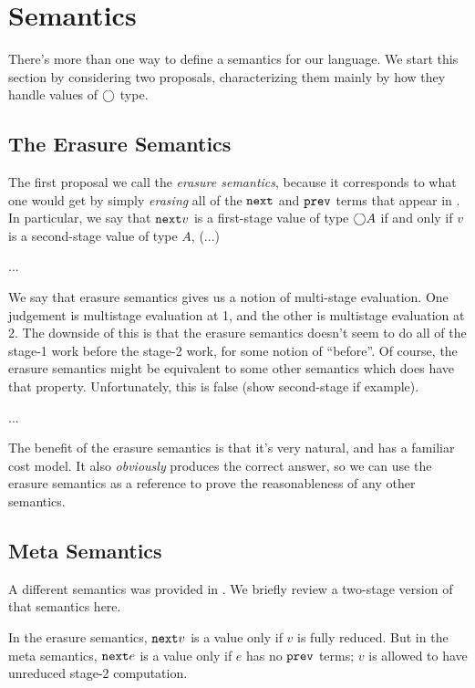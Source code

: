 
\section{Semantics}

There's more than one way to define a semantics for our language.  We start this section by considering two proposals, characterizing them mainly by how they handle values of $\bigcirc$ type.

\subsection{The Erasure Semantics}

The first proposal we call the {\em erasure semantics}, because it corresponds to what one would get by simply {\em erasing} all of the ${\tt next}$ and ${\tt prev}$ terms that appear in \lamStaged.  In particular, we say that ${\tt next} v$ is a first-stage value of type $\bigcirc A$ if and only if $v$ is a second-stage value of type $A$, (...)

...

We say that erasure semantics gives us a notion of multi-stage evaluation.  One judgement is multistage evaluation at 1, and the other is multistage evaluation at 2.  The downside of this is that the erasure semantics doesn't seem to do all of the stage-1 work before the stage-2 work, for some notion of ``before''.  Of course, the erasure semantics might be equivalent to some other semantics which does have that property.  Unfortunately, this is false (show second-stage if example).

...

The benefit of the erasure semantics is that it's very natural, and has a familiar cost model.  It also {\em obviously} produces the correct answer, so we can use the erasure semantics as a reference to prove the reasonableness of any other semantics.

\subsection{Meta Semantics}

A different semantics was provided in \cite{davies96}.  We briefly review a two-stage version of that semantics here.

In the erasure semantics, ${\tt next} v$ is a value only if $v$ is fully reduced.  But in the meta semantics, ${\tt next} e$ is a value only if $e$ has no ${\tt prev}$ terms; $v$ is allowed to have unreduced stage-2 computation. 

